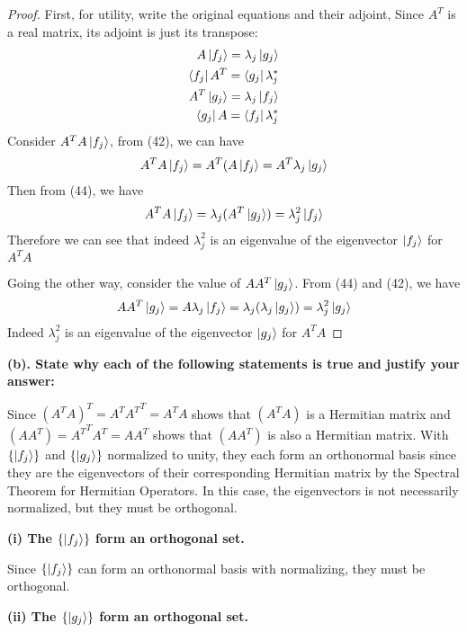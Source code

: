 \documentclass{article}
\newcommand{\Set}[1]{\{#1\}}
\begin{document}
\begin{proof}
    First, for utility, write the original equations and their adjoint, Since $A^T$ is a real matrix, its adjoint is just its transpose:
    \begin{align}
        A \ket{f_j} = \lambda_j \ket{g_j} \\
        \bra{f_j} A^T = \bra{g_j} \lambda^*_j \\
        A^T \ket{g_j} = \lambda_j \ket{f_j} \\
        \bra{g_j} A = \bra{f_j} \lambda^*_j 
    \end{align}
    Consider $A^TA \ket{f_j}$, from (42), we can have
    \begin{align}
        A^TA \ket{f_j} = A^T(A\ket{f_j} = A^T \lambda_j \ket{g_j}
    \end{align}
    Then from (44), we have
    \begin{align}
        A^TA \ket{f_j} = \lambda_j (A^T \ket{g_j}) = \lambda^2_j \ket{f_j}
    \end{align}
    Therefore we can see that indeed $\lambda^2_j$ is an eigenvalue of the eigenvector $\ket{f_j}$ for $A^T A$
    
    Going the other way, consider the value of $AA^T \ket{g_j}$. From (44) and (42), we have
    \begin{align}
        AA^T \ket{g_j} = A \lambda_j \ket{f_j} = \lambda_j (\lambda_j \ket{g_j}) = \lambda^2_j \ket{g_j}
    \end{align}
    Indeed $\lambda^2_j$ is an eigenvalue of the eigenvector $\ket{g_j}$ for $A^T A$
\end{proof}

\textbf{(b). State why each of the following statements is true and justify your answer:}

Since $(A^TA)^T = A^T {A^T}^T = A^T A$ shows that $(A^TA)$ is a Hermitian matrix and $(AA^T) = {A^T}^T A^T = AA^T$ shows that $(AA^T)$ is also a Hermitian matrix. With $\Set{\ket{f_j}}$ and $\Set{\ket{g_j}}$ normalized to unity, they each form an orthonormal basis since they are the eigenvectors of their corresponding Hermitian matrix by the Spectral Theorem for Hermitian Operators. In this case, the eigenvectors is not necessarily normalized, but they must be orthogonal.

\textbf{(i) The $\{\ket{f_j}\}$ form an orthogonal set.}

Since $\Set{\ket{f_j}}$ can form an orthonormal basis with normalizing, they must be orthogonal.

\textbf{(ii) The $\{\ket{g_j}\}$ form an orthogonal set.}
\end{document}
